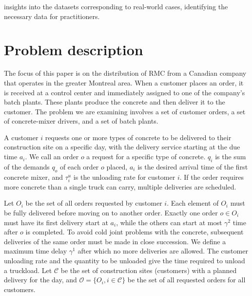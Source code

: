 \documentclass{article}
\begin{document}
insights into the datasets corresponding to real-world cases, identifying the necessary data for practitioners.

\section{Problem description}
\label{desc_form}
The focus of this paper is on the distribution of RMC from a Canadian company that operates in the greater Montreal area. When a customer places an order, it is received at a control center and immediately assigned to one of the company's batch plants. These plants produce the concrete and then deliver it to the customer. The problem we are examining involves a set of customer orders, a set of concrete-mixer drivers, and a set of batch plants.


A customer $i$ requests one or more types of concrete to be delivered to their construction site on a specific day, with the delivery service starting at the due time $a_i$.  We call an order $o$ a request for a specific type of concrete. $q_i$ is the sum of the demands $q_o$ of each order $o$ placed, $a_i$ is the desired arrival time of the first concrete mixer, and $\tau^u_i$ is the unloading rate for customer $i$. If the order requires more concrete than a single truck can carry, multiple deliveries are scheduled.

Let $O_i$ be the set of all orders requested by customer $i$. Each element of $O_i$ must be fully delivered before moving on to another order. Exactly one order $o \in O_i$ must have its first delivery start at $a_i$, while the others can start at most $\gamma^2$ time after $o$ is completed. %
To avoid cold joint problems with the concrete, subsequent deliveries of the same order must be made in close succession. We define a maximum time delay $\gamma^1$ after which no more deliveries are allowed. The customer unloading rate and the quantity to be unloaded give the time required to unload a truckload. Let $\mathcal{C}$ be the set of construction sites (customers) with a planned delivery for the day, and $\mathcal{O}=\{{O_i, i \in \mathcal{C}}\}$ be the set of all requested orders for all customers.
\end{document}
